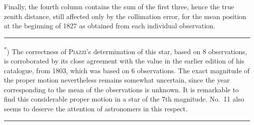 Finally, the fourth column contains the sum of the first three, hence the true zenith
distance, still affected only by the collimation error, for the mean position at the
beginning of 1827 as obtained from each individual observation.

\medskip\noindent\rule{.24\textwidth}{.4pt}\par
{\footnotesize
\noindent\textsuperscript{*}) The correctness of \textsc{Piazzi}'s determination of this star,
based on 8 observations, is corroborated by its close agreement with the value in the earlier
edition of his catalogue, from 1803, which was based on 6 observations. The exact magnitude of
the proper motion nevertheless remains somewhat uncertain, since the year corresponding to the
mean of the observations is unknown. It is remarkable to find this considerable proper motion
in a star of the 7th magnitude. No.\ 11 also seems to deserve the attention of astronomers in
this respect.\par}
\begin{center}\rule{.24\textwidth}{.4pt}\end{center}
